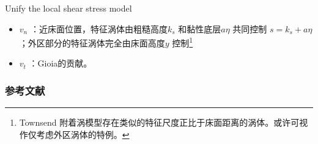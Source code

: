 \documentclass[10pt,xcolor={table,dvipsnames},t]{beamer}
\begin{document}
\begin{frame}{Unify the local shear stress model}
    \begin{itemize}
        \item $v_n$ ：近床面位置，特征涡体由粗糙高度$k_s$ 和黏性底层$a\eta$ 共同控制 $s = k_s + a\eta$；外区部分的特征涡体完全由床面高度$y$ 控制\footnote{Townsend 附着涡模型存在类似的特征尺度正比于床面距离的涡体。或许可视作仅考虑外区涡体的特例。}
        \item $v_t$ ：Gioia的贡献。
    \end{itemize}
\end{frame}

\begin{frame}[allowframebreaks]
  \frametitle{参考文献}
  \printbibliography[heading=bibliography,title=参考文献]
\end{frame}
\end{document}
